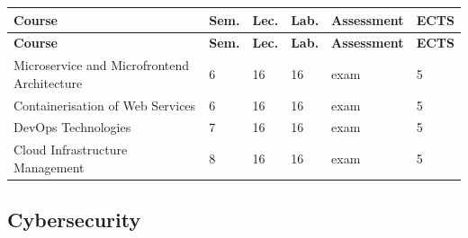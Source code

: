 \documentclass[12pt,a4paper]{article}
\newcommand{\thdrule}{\noalign{\global\setlength{\extrarowheight}{0pt}}}
\newcommand{\thdend}{\noalign{\global\setlength{\extrarowheight}{4pt}}}
\begin{document}
{\scriptsize
\begin{longtable}{m{6.5cm}m{0.7cm}m{1cm}m{1cm}m{1.7cm}m{0.7cm}}
\thdrule\toprule
\rowcolor{pjatkRed}
{\color{white}\footnotesize\textbf{\vphantom{Ag}Course}} & {\color{white}\footnotesize\textbf{\vphantom{Ag}Sem.}} & {\color{white}\footnotesize\textbf{\vphantom{Ag}Lec.}} & {\color{white}\footnotesize\textbf{\vphantom{Ag}Lab.}} & {\color{white}\footnotesize\textbf{\vphantom{Ag}Assessment}} & {\color{white}\footnotesize\textbf{\vphantom{Ag}ECTS}} \\
\midrule\thdend
\endfirsthead
\thdrule\toprule
\rowcolor{pjatkRed}
{\color{white}\footnotesize\textbf{\vphantom{Ag}Course}} & {\color{white}\footnotesize\textbf{\vphantom{Ag}Sem.}} & {\color{white}\footnotesize\textbf{\vphantom{Ag}Lec.}} & {\color{white}\footnotesize\textbf{\vphantom{Ag}Lab.}} & {\color{white}\footnotesize\textbf{\vphantom{Ag}Assessment}} & {\color{white}\footnotesize\textbf{\vphantom{Ag}ECTS}} \\
\midrule\thdend
\endhead
\rowcolor{tableRowLight} Microservice and Microfrontend Architecture & 6 & 16 & 16 & {\scriptsize exam} & 5 \\
\rowcolor{tableRowAlt} Containerisation of Web Services & 6 & 16 & 16 & {\scriptsize exam} & 5 \\
\rowcolor{tableRowLight} DevOps Technologies & 7 & 16 & 16 & {\scriptsize exam} & 5 \\
\rowcolor{tableRowAlt} Cloud Infrastructure Management & 8 & 16 & 16 & {\scriptsize exam} & 5 \\
\bottomrule
\end{longtable}}

\subsection*{Cybersecurity}
\end{document}

